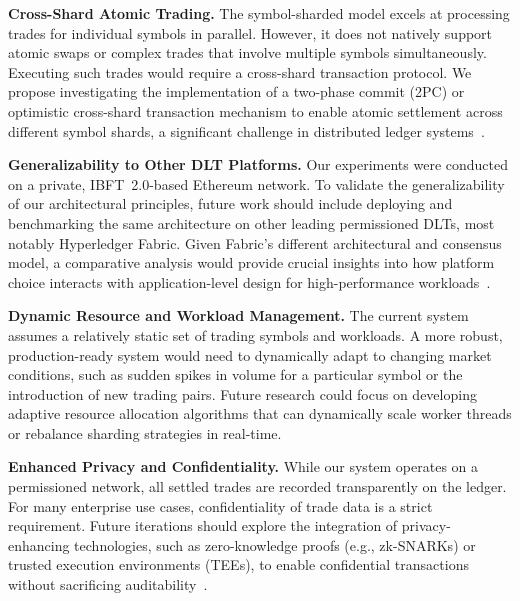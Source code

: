 \textbf{Cross-Shard Atomic Trading.} The symbol-sharded model excels at processing trades for individual symbols in parallel. However, it does not natively support atomic swaps or complex trades that involve multiple symbols simultaneously. Executing such trades would require a cross-shard transaction protocol. We propose investigating the implementation of a two-phase commit (2PC) or optimistic cross-shard transaction mechanism to enable atomic settlement across different symbol shards, a significant challenge in distributed ledger systems~\cite{zhang2023frontrunning,harris2002crossshard}.

\textbf{Generalizability to Other DLT Platforms.} Our experiments were conducted on a private, IBFT~2.0-based Ethereum network. To validate the generalizability of our architectural principles, future work should include deploying and benchmarking the same architecture on other leading permissioned DLTs, most notably Hyperledger Fabric. Given Fabric's different architectural and consensus model, a comparative analysis would provide crucial insights into how platform choice interacts with application-level design for high-performance workloads~\cite{ucbas2023performance,baliga2018hyperledger}.

\textbf{Dynamic Resource and Workload Management.} The current system assumes a relatively static set of trading symbols and workloads. A more robust, production-ready system would need to dynamically adapt to changing market conditions, such as sudden spikes in volume for a particular symbol or the introduction of new trading pairs. Future research could focus on developing adaptive resource allocation algorithms that can dynamically scale worker threads or rebalance sharding strategies in real-time.

\textbf{Enhanced Privacy and Confidentiality.} While our system operates on a permissioned network, all settled trades are recorded transparently on the ledger. For many enterprise use cases, confidentiality of trade data is a strict requirement. Future iterations should explore the integration of privacy-enhancing technologies, such as zero-knowledge proofs (e.g., zk-SNARKs) or trusted execution environments (TEEs), to enable confidential transactions without sacrificing auditability~\cite{bensasson2014zerocash}.

